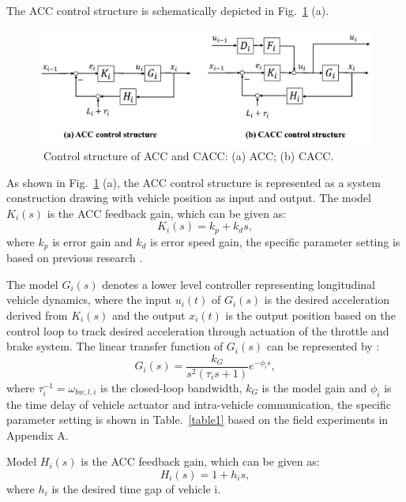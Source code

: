 \documentclass[journal]{IEEEtran}
\begin{document}
The ACC control structure is schematically depicted in Fig.~\ref{fig2} (a).

\begin{figure}
  \centering
  \includegraphics[width=12cm]{figs/fig2.png}
  \caption{~Control structure of ACC and CACC: (a) ACC; (b) CACC.}
  \label{fig2}
\end{figure}

As shown in Fig.~\ref{fig2} (a), the ACC control structure is represented as a system construction drawing with vehicle position as input and output. The model $K_i (s)$ is the ACC feedback gain, which can be given as:
\begin{equation}
  K_{i}(s)=k_{p}+k_{d} s,
\end{equation}
where $k_p$ is error gain and $k_d$ is error speed gain, the specific parameter setting is based on previous research \citep{milanes2014modeling,milanes2013cooperative}.

The model $G_i (s)$ denotes a lower level controller representing longitudinal vehicle dynamics, where the input $u_i (t)$ of $G_i (s)$ is the desired acceleration derived from $K_i (s)$ and the output $x_i (t)$ is the output position based on the control loop to track desired acceleration through actuation of the throttle and brake system. The linear transfer function of $G_i (s)$ can be represented by \citep{ploeg2013lp}:
\begin{equation}
  G_{i}(s)=\frac{k_{G}}{s^{2}\left(\tau_{i} s+1\right)} e^{-\phi_{i} s},
\end{equation}
where $\tau_{i}^{-1}=\omega_{b w, l, i}$ is the closed-loop bandwidth, $k_G$ is the model gain and $\phi_{i}$ is the time delay of vehicle actuator and intra-vehicle
communication, the specific parameter setting is shown in Table.~\ref{table1} based on the field experiments in Appendix A.

Model $H_i (s)$ is the ACC feedback gain, which can be given as:
\begin{equation}
  H_{i}(s)=1+h_{i} s,
\end{equation}
where $h_i$ is the desired time gap of vehicle i.
\end{document}
